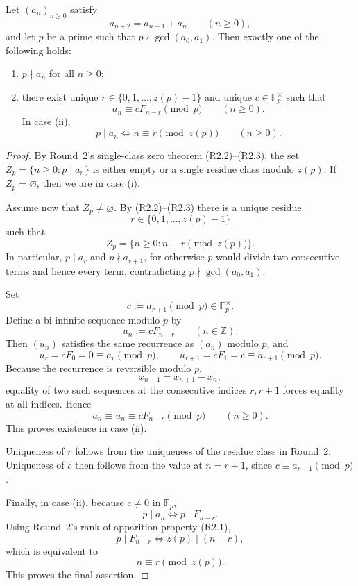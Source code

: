 \begin{lemma}\label{lem:localparam}
Let $(a_n)_{n\ge 0}$ satisfy
\[
a_{n+2}=a_{n+1}+a_n \qquad (n\ge 0),
\]
and let $p$ be a prime such that $p\nmid \gcd(a_0,a_1)$. Then exactly one of the following holds:
\begin{enumerate}
\item[(i)] $p\nmid a_n$ for all $n\ge 0$;
\item[(ii)] there exist unique $r\in\{0,1,\dots,z(p)-1\}$ and unique $c\in \mathbb F_p^{\times}$ such that
\[
a_n\equiv cF_{n-r}\pmod p \qquad (n\ge 0).
\]
In case \textup{(ii)},
\[
p\mid a_n \iff n\equiv r\pmod{z(p)} \qquad (n\ge 0).
\]
\end{enumerate}
\end{lemma}
\begin{proof}
By Round~2's single-class zero theorem (R2.2)--(R2.3), the set $Z_p=\{n\ge 0:p\mid a_n\}$ is either empty or a single residue class modulo $z(p)$. If $Z_p=\varnothing$, then we are in case (i).

Assume now that $Z_p\neq\varnothing$. By (R2.2)--(R2.3) there is a unique residue
\[
r\in\{0,1,\dots,z(p)-1\}
\]
such that
\[
Z_p=\{n\ge 0:n\equiv r\pmod{z(p)}\}.
\]
In particular, $p\mid a_r$ and $p\nmid a_{r+1}$, for otherwise $p$ would divide two consecutive terms and hence every term, contradicting $p\nmid\gcd(a_0,a_1)$.

Set
\[
c:=a_{r+1}\pmod p\in \mathbb F_p^{\times}.
\]
Define a bi-infinite sequence modulo $p$ by
\[
u_n:=cF_{n-r} \qquad (n\in\mathbb Z).
\]
Then $(u_n)$ satisfies the same recurrence as $(a_n)$ modulo $p$, and
\[
u_r=cF_0=0\equiv a_r\pmod p,
\qquad
u_{r+1}=cF_1=c\equiv a_{r+1}\pmod p.
\]
Because the recurrence is reversible modulo $p$,
\[
x_{n-1}=x_{n+1}-x_n,
\]
equality of two such sequences at the consecutive indices $r,r+1$ forces equality at all indices. Hence
\[
a_n\equiv u_n\equiv cF_{n-r}\pmod p \qquad (n\ge 0).
\]
This proves existence in case (ii).

Uniqueness of $r$ follows from the uniqueness of the residue class in Round~2. Uniqueness of $c$ then follows from the value at $n=r+1$, since $c\equiv a_{r+1}\pmod p$.

Finally, in case (ii), because $c\ne 0$ in $\mathbb F_p$,
\[
p\mid a_n \iff p\mid F_{n-r}.
\]
Using Round~2's rank-of-apparition property (R2.1),
\[
p\mid F_{n-r} \iff z(p)\mid (n-r),
\]
which is equivalent to
\[
n\equiv r\pmod{z(p)}.
\]
This proves the final assertion.
\end{proof}

